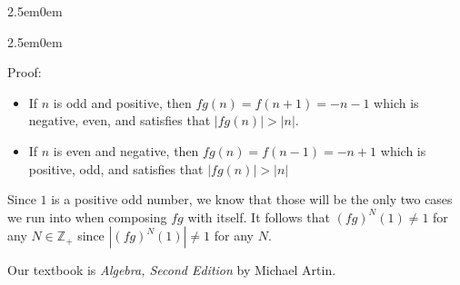 \documentclass{book}
\newcommand{\exOne}{%
   \color{Purple}%
   \fontsize{13}{15}\selectfont%
}
\newcommand{\exTwoP}{%
   \color{RedViolet}%
   \fontsize{13}{15}\selectfont%
}
\newenvironment{myIndent}{%
   \begin{adjustwidth}{2.5em}{0em}%
}{%
   \end{adjustwidth}%
}
\newcommand{\retTwo}{\hfill\bigbreak}
\begin{document}
\begin{enumerate}
\begin{enumerate}
\begin{myIndent}
			
			\begin{myIndent}\exTwoP
				Proof:\\ [-20pt]
				\begin{itemize}
					\item If $n$ is odd and positive, then $fg(n) = f(n + 1) = -n - 1$ which is negative, even, and satisfies that $|fg(n)| > |n|$.
					\item If $n$ is even and negative, then $fg(n) = f(n - 1) = -n + 1$ which is positive, odd, and satisfies that $|fg(n)| > |n|$\retTwo
				\end{itemize}

				Since $1$ is a positive odd number, we know that those will be the only two cases we run into when composing $fg$ with itself. It follows that $(fg)^N(1) \neq 1$ for any $N \in \mathbb{Z}_+$ since $|(fg)^N(1)| \neq 1$ for any $N$.
			\end{myIndent}\exTwoP
		\end{myIndent}

	\end{enumerate}
	
\end{enumerate}


\newpage

\exOne Our textbook is \textit{Algebra, Second Edition} by Michael Artin.
\end{document}
